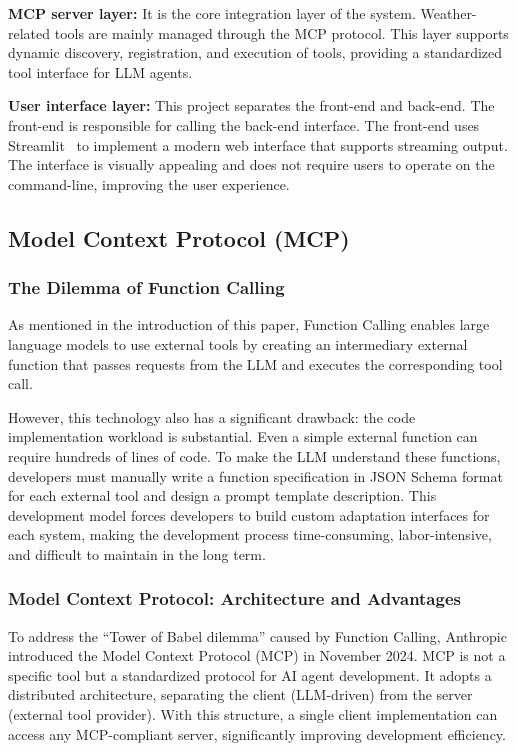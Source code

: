 \documentclass[final-report]{report-template}
\begin{document}
\textbf{MCP server layer:}
It is the core integration layer of the system. Weather-related tools are mainly managed through the MCP protocol. This layer supports dynamic discovery, registration, and execution of tools, providing a standardized tool interface for LLM agents.


\textbf{User interface layer:}
This project separates the front-end and back-end. The front-end is responsible for calling the back-end interface. The front-end uses Streamlit~\cite{Streamlit2025} to implement a modern web interface that supports streaming output. The interface is visually appealing and does not require users to operate on the command-line, improving the user experience.

\subsection{Model Context Protocol (MCP)}
\subsubsection{The Dilemma of Function Calling}
As mentioned in the introduction of this paper, Function Calling enables large language models to use external tools by creating an intermediary external function that passes requests from the LLM and executes the corresponding tool call.

However, this technology also has a significant drawback: the code implementation workload is substantial. Even a simple external function can require hundreds of lines of code. To make the LLM understand these functions, developers must manually write a function specification in JSON Schema format for each external tool and design a prompt template description. This development model forces developers to build custom adaptation interfaces for each system, making the development process time-consuming, labor-intensive, and difficult to maintain in the long term. 

\subsubsection{Model Context Protocol: Architecture and Advantages}
To address the “Tower of Babel dilemma” caused by Function Calling, Anthropic introduced the Model Context Protocol (MCP) in November 2024. MCP is not a specific tool but a standardized protocol for AI agent development. It adopts a distributed architecture, separating the client (LLM-driven) from the server (external tool provider). With this structure, a single client implementation can access any MCP-compliant server, significantly improving development efficiency.
\end{document}
